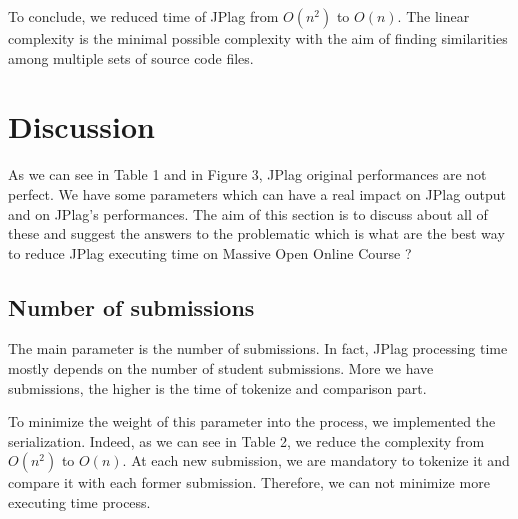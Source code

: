 \documentclass[twoside]{article}
\begin{document}
\begin{multicols*}{2}
\begin{table}[H]
\caption{Complexity of JPlag without serialization and with serialization}
\end{table}

To conclude, we reduced time of JPlag from $O(n^2)$ to $O(n)$. The linear complexity is the minimal possible complexity with the aim of finding similarities among multiple sets of source code files.

\vspace{0.5cm}
\section{Discussion}

As we can see in Table 1 and in Figure 3, JPlag original performances are not perfect. We have some parameters which can have a real impact on JPlag output and on JPlag's performances. The aim of this section is to discuss about all of these and suggest the answers to the problematic which is what are the best way to reduce JPlag executing time on Massive Open Online Course ?

\subsection{Number of submissions}

The main parameter is the number of submissions. In fact, JPlag processing time mostly depends on the number of student submissions. More we have submissions, the higher is the time of tokenize and comparison part. 

To minimize the weight of this parameter into the process, we implemented the serialization. Indeed, as we can see in Table 2, we reduce the complexity from $O(n^2)$ to $O(n)$. At each new submission, we are mandatory to tokenize it and compare it with each former submission. Therefore, we can not minimize more executing time process. 
\vfill


\end{multicols*}
\end{document}
